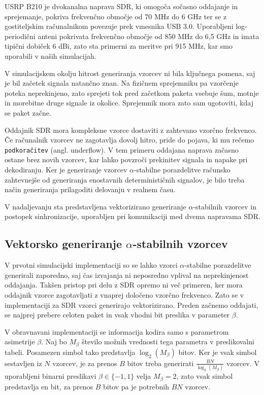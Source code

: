 \documentclass[a4paper, 12pt, openany]{book}
\begin{document}
USRP B210 je dvokanalna naprava SDR, ki omogoča sočasno oddajanje in sprejemanje, pokriva frekvenčno območje od 70 MHz do 6 GHz ter se z gostiteljskim računalnikom povezuje prek vmesnika USB 3.0. Uporabljeni log-periodični anteni pokrivata frekvenčno območje od 850 MHz do 6,5 GHz in imata tipični dobiček 6 dBi, zato sta primerni za meritve pri 915 MHz, kar smo uporabili v naših simulacijah.

V simulacijskem okolju hitrost generiranja vzorcev ni bila ključnega pomena, saj je bil začetek signala natančno znan. Na fizičnem sprejemniku pa vzorčenje poteka neprekinjeno, zato sprejeti tok pred začetkom paketa vsebuje šum, motnje in morebitne druge signale iz okolice. Sprejemnik mora zato sam ugotoviti, kdaj se paket začne.

Oddajnik SDR mora kompleksne vzorce dostaviti z zahtevano vzorčno frekvenco. Če računalnik vzorcev ne zagotavlja dovolj hitro, pride do pojava, ki mu rečemo \texttt{podkoračitev}  (angl. underflow). V tem primeru oddajana naprava začasno ostane brez novih vzorcev, kar lahko povzroči prekinitev signala in napake pri dekodiranju. Ker je generiranje vzorcev $\alpha$-stabilne porazdelitve računsko zahtevnejše od generiranja enostavnih determinističnih signalov, je bilo treba način generiranja prilagoditi delovanju v realnem času. 

V nadaljevanju sta predstavljena vektorizirano generiranje $\alpha$-stabilnih vzorcev in postopek sinhronizacije, uporabljen pri komunikaciji med dvema napravama SDR.

\subsection{Vektorsko generiranje $\alpha$-stabilnih vzorcev}

V prvotni simulacijski implementaciji so se lahko vzorci $\alpha$-stabilne porazdelitve generirali zaporedno, saj čas izvajanja ni neposredno vplival na neprekinjenost oddajanja. Takšen pristop pri delu z SDR opremo ni več primeren, ker mora oddajnik vzorce zagotavljati z vnaprej določeno vzorčno frekvenco. Zato se v implementaciji za SDR vzorci generirajo vektorizirano. Preden začnemo oddajati, se najprej prebere celoten paket in vsak vhodni bit preslika v parameter $\beta$. 

V obravnavani implementaciji se informacija kodira samo s parametrom asimetrije $\beta$. Naj bo $M_\beta$ število možnih vrednosti tega parametra v preslikovalni tabeli. Posamezen simbol tako predstavlja $\log_2(M_\beta)$ bitov. Ker je vsak simbol sestavljen iz $N$ vzorcev, je za prenos $B$ bitov treba generirati $\frac{BN}{\log_2(M_\beta)}$ vzorcev. V uporabljeni binarni preslikavi $\beta\in\{-1,1\}$ velja $M_\beta=2$, zato vsak simbol predstavlja en bit, za prenos $B$ bitov pa je potrebnih $BN$ vzorcev.
 
\end{document}
